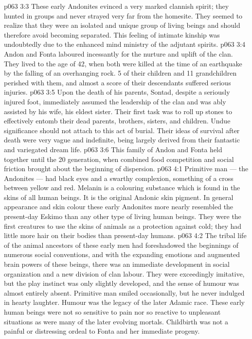 \vs p063 3:3 These early Andonites evinced a very marked clannish spirit; they hunted in groups and never strayed very far from the homesite. They seemed to realize that they were an isolated and unique group of living beings and should therefore avoid becoming separated. This feeling of intimate kinship was undoubtedly due to the enhanced mind ministry of the adjutant spirits.
\vs p063 3:4 \pc Andon and Fonta laboured incessantly for the nurture and uplift of the clan. They lived to the age of 42, when both were killed at the time of an earthquake by the falling of an overhanging rock. 5 of their children and 11 grandchildren perished with them, and almost a score of their descendants suffered serious injuries.
\vs p063 3:5 Upon the death of his parents, Sontad, despite a seriously injured foot, immediately assumed the leadership of the clan and was ably assisted by his wife, his eldest sister. Their first task was to roll up stones to effectively entomb their dead parents, brothers, sisters, and children. Undue significance should not attach to this act of burial. Their ideas of survival after death were very vague and indefinite, being largely derived from their fantastic and variegated dream life.
\vs p063 3:6 \pc This family of Andon and Fonta held together until the 20 generation, when combined food competition and social friction brought about the beginning of dispersion.
\vs p063 4:1 Primitive man --- the Andonites --- had black eyes and a swarthy complexion, something of a cross between yellow and red. Melanin is a colouring substance which is found in the skins of all human beings. It is the original Andonic skin pigment. In general appearance and skin colour these early Andonites more nearly resembled the present\hyp{}day Eskimo than any other type of living human beings. They were the first creatures to use the skins of animals as a protection against cold; they had little more hair on their bodies than present\hyp{}day humans.
\vs p063 4:2 The tribal life of the animal ancestors of these early men had foreshadowed the beginnings of numerous social conventions, and with the expanding emotions and augmented brain powers of these beings, there was an immediate development in social organization and a new division of clan labour. They were exceedingly imitative, but the play instinct was only slightly developed, and the sense of humour was almost entirely absent. Primitive man smiled occasionally, but he never indulged in hearty laughter. Humour was the legacy of the later Adamic race. These early human beings were not so sensitive to pain nor so reactive to unpleasant situations as were many of the later evolving mortals. Childbirth was not a painful or distressing ordeal to Fonta and her immediate progeny.
